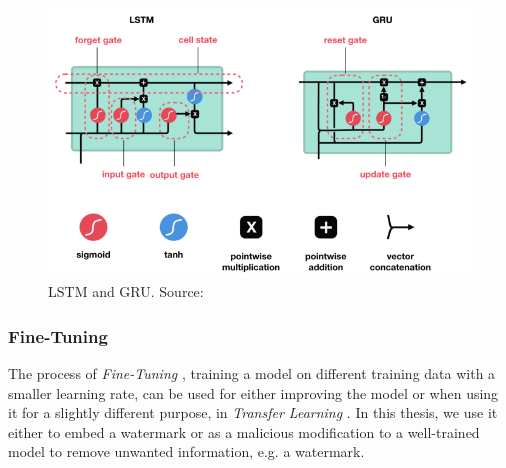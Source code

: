 \begin{figure}
    \centering
    \includegraphics[width= 0.8 \linewidth]{images/LSTM_and_GRU.png}
    \caption{LSTM and GRU. Source: \cite{phi_illustrated_2018}}
    \label{fig:lstm_gru}
\end{figure}









\subsubsection{Fine-Tuning}
The process of \textit{Fine-Tuning} \cite{girshick_rich_2014}, training a model on different training data with a smaller learning rate, can be used for either improving the model or when using it for a slightly different purpose, in \textit{Transfer Learning} \cite{pan_survey_2010}. In this thesis, we use it either to embed a watermark or as a malicious modification to a well-trained model to remove unwanted information, e.g. a watermark.

